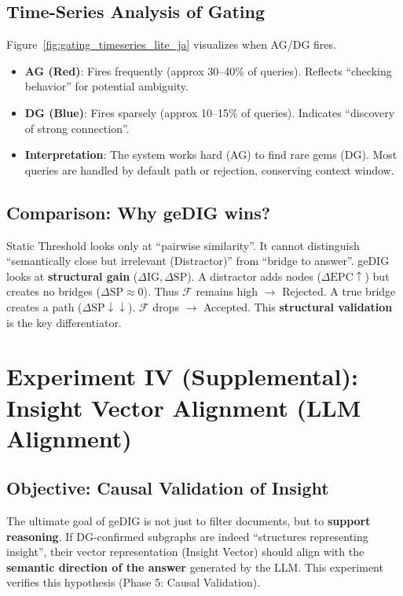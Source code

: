 \documentclass[12pt]{article}
\newcommand{\F}{\mathcal{F}}
\begin{document}
\subsection{Time-Series Analysis of Gating}
Figure~\ref{fig:gating_timeseries_lite_ja} visualizes when AG/DG fires.
\begin{itemize}
    \item \textbf{AG (Red)}: Fires frequently (approx 30--40\% of queries). Reflects ``checking behavior'' for potential ambiguity.
    \item \textbf{DG (Blue)}: Fires sparsely (approx 10--15\% of queries). Indicates ``discovery of strong connection''.
    \item \textbf{Interpretation}: The system works hard (AG) to find rare gems (DG). Most queries are handled by default path or rejection, conserving context window.
\end{itemize}

\subsection{Comparison: Why geDIG wins?}
Static Threshold looks only at ``pairwise similarity''. It cannot distinguish ``semantically close but irrelevant (Distractor)'' from ``bridge to answer''.
geDIG looks at \textbf{structural gain} ($\Delta\mathrm{IG}, \Delta\mathrm{SP}$). A distractor adds nodes ($\Delta\mathrm{EPC}\uparrow$) but creates no bridges ($\Delta\mathrm{SP}\approx 0$). Thus $\F$ remains high $\to$ Rejected.
A true bridge creates a path ($\Delta\mathrm{SP} \downarrow\downarrow$). $\F$ drops $\to$ Accepted.
This \textbf{structural validation} is the key differentiator.

\section{Experiment IV (Supplemental): Insight Vector Alignment (LLM Alignment)}
\label{sec:alignment_experiment}

\subsection{Objective: Causal Validation of Insight}
The ultimate goal of geDIG is not just to filter documents, but to \textbf{support reasoning}.
If DG-confirmed subgraphs are indeed ``structures representing insight'', their vector representation (Insight Vector) should align with the \textbf{semantic direction of the answer} generated by the LLM.
This experiment verifies this hypothesis (Phase 5: Causal Validation).
\end{document}
